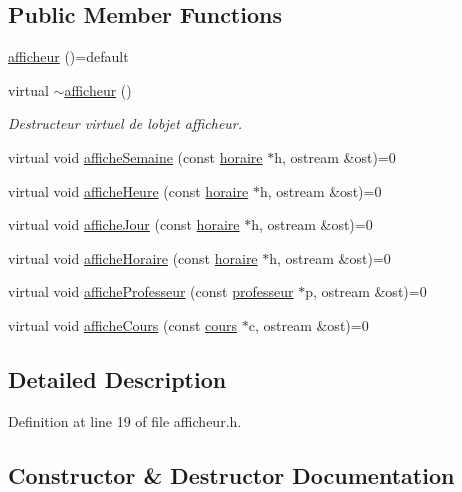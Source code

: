 \subsection*{Public Member Functions}
\begin{DoxyCompactItemize}
\item 
\hyperlink{classafficheur_a6bc02ed7b0dbbb21607528ae03c4f886}{afficheur} ()=default
\item 
virtual \hyperlink{classafficheur_a093c44d15f6de24883abce836bfd11c9}{$\sim$afficheur} ()
\begin{DoxyCompactList}\small\item\em Destructeur virtuel de l\textquotesingle{}objet afficheur. \end{DoxyCompactList}\item 
virtual void \hyperlink{classafficheur_a1551534b5916a48d3ea73f0d68929e95}{affiche\+Semaine} (const \hyperlink{classhoraire}{horaire} $\ast$h, ostream \&ost)=0
\item 
virtual void \hyperlink{classafficheur_a3c3ace0f2f01e95a1cc86a0b6c497e34}{affiche\+Heure} (const \hyperlink{classhoraire}{horaire} $\ast$h, ostream \&ost)=0
\item 
virtual void \hyperlink{classafficheur_a0cea335dad556ceba3487ae261b831f9}{affiche\+Jour} (const \hyperlink{classhoraire}{horaire} $\ast$h, ostream \&ost)=0
\item 
virtual void \hyperlink{classafficheur_aa598626f11775b4c610b8f262017cad7}{affiche\+Horaire} (const \hyperlink{classhoraire}{horaire} $\ast$h, ostream \&ost)=0
\item 
virtual void \hyperlink{classafficheur_a54b3e457d56738ed20641e5546872142}{affiche\+Professeur} (const \hyperlink{classprofesseur}{professeur} $\ast$p, ostream \&ost)=0
\item 
virtual void \hyperlink{classafficheur_a9d176576ad45c2a07a8a887b853b7edb}{affiche\+Cours} (const \hyperlink{classcours}{cours} $\ast$c, ostream \&ost)=0
\end{DoxyCompactItemize}


\subsection{Detailed Description}


Definition at line 19 of file afficheur.\+h.



\subsection{Constructor \& Destructor Documentation}
\hypertarget{classafficheur_a6bc02ed7b0dbbb21607528ae03c4f886}{}\label{classafficheur_a6bc02ed7b0dbbb21607528ae03c4f886} 
